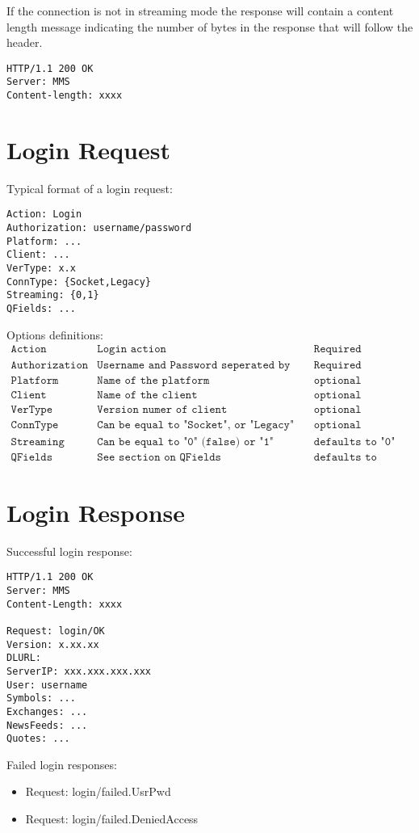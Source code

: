 \documentclass[12pt,twoside,letterpaper]{report}
\begin{document}
If the connection is not in streaming mode the response will contain a content length message indicating the number of bytes in the response that will follow the header.
\begin{verbatim}
HTTP/1.1 200 OK
Server: MMS
Content-length: xxxx
\end{verbatim}

\section*{Login Request}
Typical format of a login request:
\begin{verbatim}
Action: Login
Authorization: username/password
Platform: ...
Client: ...
VerType: x.x
ConnType: {Socket,Legacy}
Streaming: {0,1}
QFields: ...
\end{verbatim}

Options definitions:
$$
\begin{array}{lll}
\texttt{Action} & \texttt{Login action} & \texttt{Required} \\
\texttt{Authorization} & \texttt{Username and Password seperated by "/"} & \texttt{Required} \\
\texttt{Platform} & \texttt{Name of the platform} & \texttt{optional} \\
\texttt{Client} & \texttt{Name of the client} & \texttt{optional} \\
\texttt{VerType} & \texttt{Version numer of client} & \texttt{optional} \\
\texttt{ConnType} & \texttt{Can be equal to "Socket", or "Legacy"} & \texttt{optional} \\
\texttt{Streaming} & \texttt{Can be equal to "0" (false) or "1" (true)} & \texttt{defaults to "0"} \\
\texttt{QFields} & \texttt{See section on QFields} & \texttt{defaults to empty}
\end{array}
$$

\section*{Login Response}
Successful login response:
\begin{verbatim}
HTTP/1.1 200 OK
Server: MMS
Content-Length: xxxx

Request: login/OK
Version: x.xx.xx
DLURL: 
ServerIP: xxx.xxx.xxx.xxx
User: username
Symbols: ...
Exchanges: ...
NewsFeeds: ...
Quotes: ...
\end{verbatim}

Failed login responses:
\begin{itemize}
\item Request: login/failed.UsrPwd
\item Request: login/failed.DeniedAccess
\end{itemize}
\end{document}
